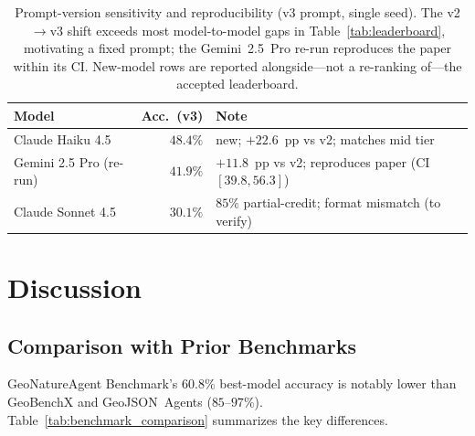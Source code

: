 \documentclass[sigconf]{acmart}
\begin{document}
\begin{table}[ht]
  \caption{Prompt-version sensitivity and reproducibility (v3 prompt, single seed). The v2$\to$v3 shift exceeds most model-to-model gaps in Table~\ref{tab:leaderboard}, motivating a fixed prompt; the Gemini~2.5~Pro re-run reproduces the paper within its CI. New-model rows are reported alongside---not a re-ranking of---the accepted leaderboard.}
  \label{tab:refresh}
  \centering
  {\footnotesize
  \begin{tabular}{l r p{}}
    \toprule
    \textbf{Model} & \textbf{Acc.\ (v3)} & \textbf{Note} \\
    \midrule
    Claude Haiku 4.5 & $48.4\%$ & new; $+22.6$~pp vs v2; matches mid tier \\
    Gemini 2.5 Pro (re-run) & $41.9\%$ & $+11.8$~pp vs v2; reproduces paper (CI $[39.8,56.3]$) \\
    Claude Sonnet 4.5 & $30.1\%$ & $85\%$ partial-credit; format mismatch (to verify) \\
    \bottomrule
  \end{tabular}}
\end{table}

\section{Discussion}
\label{sec:discussion}

\subsection{Comparison with Prior Benchmarks}

GeoNatureAgent Benchmark's $60.8\%$ best-model accuracy is notably lower than GeoBenchX and GeoJSON~Agents ($85$--$97\%$). Table~\ref{tab:benchmark_comparison} summarizes the key differences.
\end{document}
